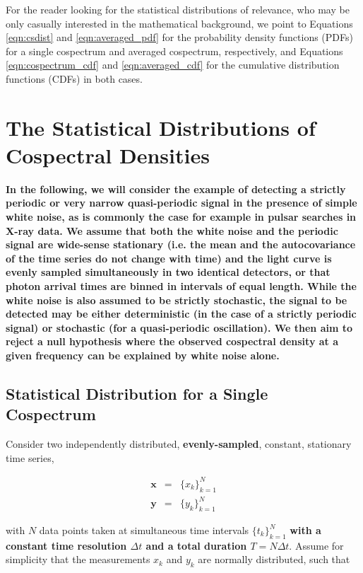 \documentclass[12pt]{emulateapj}
\begin{document}
For the reader looking for the statistical distributions of relevance, who may be only casually interested in the mathematical background, we point to Equations \ref{eqn:csdist} and \ref{eqn:averaged_pdf} for the probability density functions (PDFs) for a single cospectrum and averaged cospectrum, respectively, and Equations \ref{eqn:cospectrum_cdf} and \ref{eqn:averaged_cdf} for the cumulative distribution functions (CDFs) in both cases.


\section{The Statistical Distributions of Cospectral Densities}
\label{sec:whitenoise_cospectra}

\textbf{In the following, we will consider the example of detecting a strictly periodic or very narrow quasi-periodic signal in the presence of simple white noise, as is commonly the case for example in pulsar searches in X-ray data. We assume that both the white noise and the periodic signal are wide-sense stationary (i.e. the mean and the autocovariance of the time series do not change with time) and the light curve is evenly sampled simultaneously in two identical detectors, or that photon arrival times are binned in intervals of equal length. While the white noise is also assumed to be strictly stochastic, the signal to be detected may be either deterministic (in the case of a strictly periodic signal) or stochastic (for a quasi-periodic oscillation). We then aim to reject a null hypothesis where the observed cospectral density at a given frequency can be explained by white noise alone.}

\subsection{Statistical Distribution for a Single Cospectrum}
\label{sec:single_cospectrum}

Consider two independently distributed, \textbf{evenly-sampled}, constant, stationary time series,

\begin{eqnarray}
\mathbf{x} &=& \{x_k\}_{k=1}^N \nonumber \\
\mathbf{y} &=& \{y_k\}_{k=1}^N \nonumber
\end{eqnarray}

\noindent with $N$ data points taken at simultaneous time intervals $\{t_k\}_{k=1}^N$ \textbf{with a constant time resolution $\Delta t$ and a total duration $T = N\Delta t$}. Assume for simplicity that the measurements $x_k$ and $y_k$ are normally distributed, such that 
\end{document}

